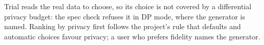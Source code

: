 \noindent Trial reads the real data to choose, so its choice is not covered by a differential privacy budget: the spec check refuses it in DP mode, where the generator is named. Ranking by privacy first follows the project's rule that defaults and automatic choices favour privacy; a user who prefers fidelity names the generator.

\setcounter{proposition}{\value{savedpropselect}}
